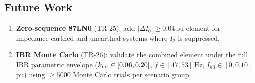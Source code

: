 \documentclass[11pt,a4paper]{article}
\begin{document}
\subsection{Future Work}

\begin{enumerate}
  \item \textbf{Zero-sequence 87LN0} (TR-25): add $|{\Delta I_0}| \geq
    0.04$\,pu element for impedance-earthed and unearthed systems where
    $I_2$ is suppressed.
  \item \textbf{IBR Monte Carlo} (TR-26): validate the combined element
    under the full IBR parametric envelope
    ($k_{\rm ibr}\in[0.06,0.20]$, $f\in[47,53]$\,Hz, $I_{h3}\in[0,0.10]$\,pu)
    using $\geq 5000$ Monte Carlo trials per scenario group.
\end{enumerate}



\end{document}
